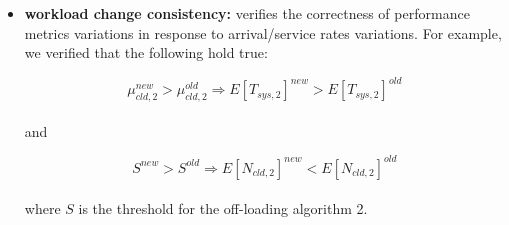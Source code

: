 \begin{itemize}
	\item \textbf{workload change consistency:} verifies the correctness of performance metrics variations in response to arrival/service rates variations. For example, we verified that the following hold true:
	
	\begin{equation}
		\mu_{cld,2}^{new} > \mu_{cld,2}^{old} \Rightarrow E[T_{sys,2}]^{new} > E[T_{sys,2}]^{old}
	\end{equation}
	\\
	and
	
	\begin{equation}
	S^{new} > S^{old} \Rightarrow E[N_{cld,2}]^{new} < E[N_{cld,2}]^{old}
	\end{equation}
	\\
	where $S$ is the threshold for the off-loading algorithm 2.
\end{itemize}